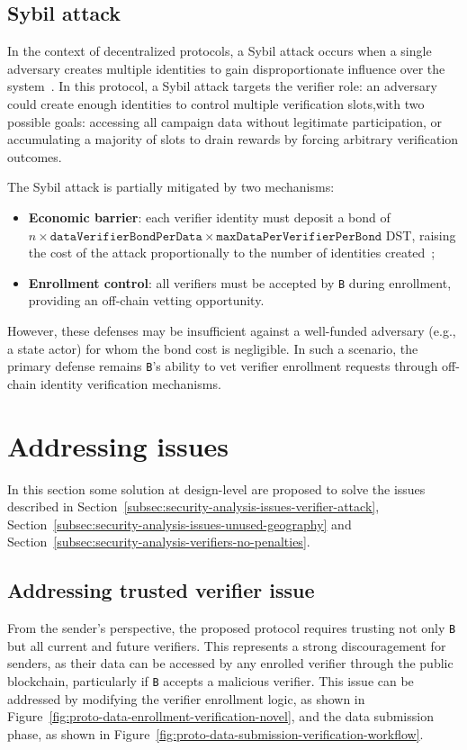 \subsection{Sybil attack}\label{subsec:security-analysis-verifier-sybil}
In the context of decentralized protocols, a Sybil attack occurs when a single adversary creates multiple identities to gain disproportionate influence over the system~\cite{douceur2002sybil}.
In this protocol, a Sybil attack targets the verifier role: an adversary could create enough identities to control multiple verification slots,with two possible goals: accessing all campaign data without legitimate
participation, or accumulating a majority of slots to drain rewards by forcing arbitrary verification outcomes.

The Sybil attack is partially mitigated by two mechanisms:
\begin{itemize}
    \item \textbf{Economic barrier}: each verifier identity must deposit
    a bond of \newline $n \times \texttt{dataVerifierBondPerData} \times
    \texttt{maxDataPerVerifierPerBond}$ DST, raising the cost of
    the attack proportionally to the number of identities created~\cite{chatzopoulos2018privacy, ying2025chaser};
    \item \textbf{Enrollment control}: all verifiers must be accepted
    by \texttt{B} during enrollment, providing an off-chain vetting
    opportunity.
\end{itemize}

However, these defenses may be insufficient against a well-funded adversary (e.g., a state actor) for whom the bond cost is negligible.
In such a scenario, the primary defense remains \texttt{B}'s ability to vet verifier enrollment requests through off-chain identity verification mechanisms.

\section{Addressing issues}\label{sec:addressing-issues}
In this section some solution at design-level are proposed to solve the issues described in
Section~\ref{subsec:security-analysis-issues-verifier-attack},
Section~\ref{subsec:security-analysis-issues-unused-geography}
and Section~\ref{subsec:security-analysis-verifiers-no-penalties}.

\subsection{Addressing trusted verifier issue}\label{subsec:addressing-issues-trusted-verifier-issue}
From the sender's perspective, the proposed protocol requires trusting not  only \texttt{B} but all current and future verifiers.
This represents a strong discouragement for senders, as their data can be accessed by any enrolled verifier through the public blockchain, particularly if \texttt{B} accepts a malicious verifier.
This issue can be addressed by modifying the verifier enrollment logic, as shown in Figure~\ref{fig:proto-data-enrollment-verification-novel}, and the data submission phase, as shown in Figure~\ref{fig:proto-data-submission-verification-workflow}.

